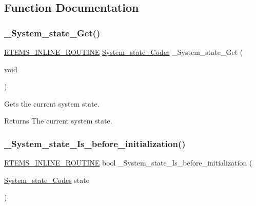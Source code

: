\subsection{Function Documentation}
\mbox{\label{group__RTEMSScoreSysState_ga1f0777590280f354ba1a73b0b4ed143e}} 
\subsubsection{\texorpdfstring{\_System\_state\_Get()}{\_System\_state\_Get()}}
{\footnotesize\ttfamily \mbox{\hyperlink{group__RTEMSScoreBaseDefs_gac216239df231d5dbd15e3520b0b9313f}{R\+T\+E\+M\+S\+\_\+\+I\+N\+L\+I\+N\+E\+\_\+\+R\+O\+U\+T\+I\+NE}} \mbox{\hyperlink{group__RTEMSScoreSysState_ga959824776c35a999ecd2720fde987d72}{System\+\_\+state\+\_\+\+Codes}} \+\_\+\+System\+\_\+state\+\_\+\+Get (\begin{DoxyParamCaption}\item[{void}]{ }\end{DoxyParamCaption})}



Gets the current system state. 

\begin{DoxyReturn}{Returns}
The current system state. 
\end{DoxyReturn}
\mbox{\label{group__RTEMSScoreSysState_ga65c9b8a4aade0388329be8525be74dbd}} 
\subsubsection{\texorpdfstring{\_System\_state\_Is\_before\_initialization()}{\_System\_state\_Is\_before\_initialization()}}
{\footnotesize\ttfamily \mbox{\hyperlink{group__RTEMSScoreBaseDefs_gac216239df231d5dbd15e3520b0b9313f}{R\+T\+E\+M\+S\+\_\+\+I\+N\+L\+I\+N\+E\+\_\+\+R\+O\+U\+T\+I\+NE}} bool \+\_\+\+System\+\_\+state\+\_\+\+Is\+\_\+before\+\_\+initialization (\begin{DoxyParamCaption}\item[{\mbox{\hyperlink{group__RTEMSScoreSysState_ga959824776c35a999ecd2720fde987d72}{System\+\_\+state\+\_\+\+Codes}}}]{state }\end{DoxyParamCaption})}



